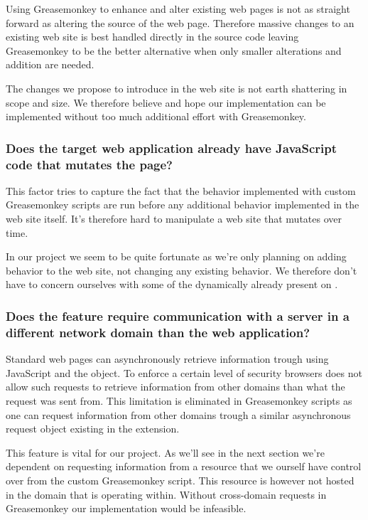 Using Greasemonkey to enhance and alter existing web pages is not as straight
forward as altering the source of the web page. Therefore massive changes to
an existing web site is best handled directly in the source code leaving
Greasemonkey to be the better alternative when only smaller alterations and
addition are needed.

The changes we propose to introduce in the \urort{} web site is not earth
shattering in scope and size. We therefore believe and hope our implementation
can be implemented without too much additional effort with Greasemonkey.

\subsubsection{Does the target web application already have JavaScript code
  that mutates the page?}

This factor tries to capture the fact that the behavior implemented with
custom Greasemonkey scripts are run before any additional behavior
implemented in the web site itself. It's therefore hard to manipulate
a web site that mutates over time.

In our project we seem to be quite fortunate as we're only planning on adding
behavior to the \urort{} web site, not changing any existing behavior.
We therefore don't have to concern ourselves with some of the dynamically
already present on \urort{}.

\subsubsection{Does the feature require communication with a server in a
  different network domain than the web application?}
\label{section:implementation.architecture,extending.different.domain}

Standard web pages can asynchronously retrieve information trough using
JavaScript and the  object. To enforce a certain
level of security browsers does not allow such requests to retrieve
information from other domains than what the request was sent from.
This limitation is eliminated in Greasemonkey scripts as one can request
information from other domains trough a similar asynchronous request object
existing in the extension.

This feature is vital for our project. As we'll see in the next section we're
dependent on requesting information from a resource that we ourself have
control over from the custom Greasemonkey script. This resource is however
not hosted in the domain that \urort{} is operating within. Without
cross-domain requests in Greasemonkey our implementation would be infeasible.

